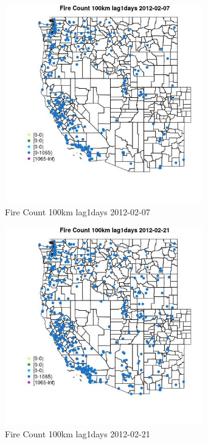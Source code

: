 \begin{figure} 
\centering  
\includegraphics[width=0.77\textwidth]{Code_Outputs/Report_ML_input_PM25_Step4_part_f_de_duplicated_aveswNAs_MapObsFire_Count_100km_lag1days2012-02-07.jpg} 
\caption{\label{fig:Report_ML_input_PM25_Step4_part_f_de_duplicated_aveswNAsMapObsFire_Count_100km_lag1days2012-02-07}Fire Count 100km lag1days 2012-02-07} 
\end{figure} 
 

\begin{figure} 
\centering  
\includegraphics[width=0.77\textwidth]{Code_Outputs/Report_ML_input_PM25_Step4_part_f_de_duplicated_aveswNAs_MapObsFire_Count_100km_lag1days2012-02-21.jpg} 
\caption{\label{fig:Report_ML_input_PM25_Step4_part_f_de_duplicated_aveswNAsMapObsFire_Count_100km_lag1days2012-02-21}Fire Count 100km lag1days 2012-02-21} 
\end{figure} 
 

